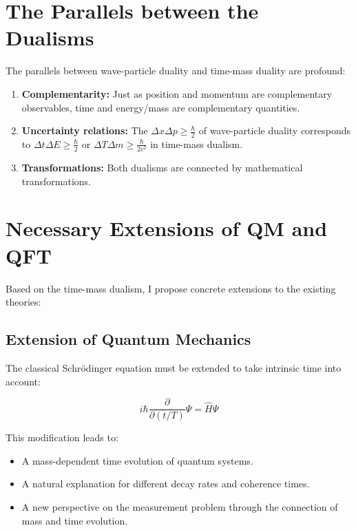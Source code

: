 \documentclass[a4paper,12pt]{article}
\begin{document}
	\section{The Parallels between the Dualisms}
	
	The parallels between wave-particle duality and time-mass duality are profound:
	
	\begin{enumerate}
		\item \textbf{Complementarity:} Just as position and momentum are complementary observables, time and energy/mass are complementary quantities.
		
		\item \textbf{Uncertainty relations:} The $\Delta x \Delta p \geq \frac{\hbar}{2}$ of wave-particle duality corresponds to $\Delta t \Delta E \geq \frac{\hbar}{2}$ or $\Delta T \Delta m \geq \frac{\hbar}{2c^2}$ in time-mass dualism.
		
		\item \textbf{Transformations:} Both dualisms are connected by mathematical transformations.
	\end{enumerate}
	
	\section{Necessary Extensions of QM and QFT}
	
	Based on the time-mass dualism, I propose concrete extensions to the existing theories:
	
	\subsection{Extension of Quantum Mechanics}
	
	The classical Schrödinger equation must be extended to take intrinsic time into account:
	
	\begin{equation}
		i\hbar \frac{\partial}{\partial (t/T)} \Psi = \hat{H} \Psi
	\end{equation}
	
	This modification leads to:
	\begin{itemize}
		\item A mass-dependent time evolution of quantum systems.
		\item A natural explanation for different decay rates and coherence times.
		\item A new perspective on the measurement problem through the connection of mass and time evolution.
	\end{itemize}
	
\end{document}
